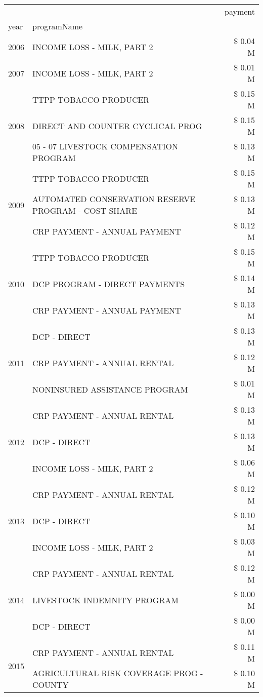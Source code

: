 \begin{tabular}{llr}
\toprule
 &  & payment \\
year & programName &  \\
\midrule
2006 & INCOME LOSS - MILK, PART 2 & \$ 0.04 M \\
\cline{1-3}
2007 & INCOME LOSS - MILK, PART 2 & \$ 0.01 M \\
\cline{1-3}
\multirow[t]{3}{*}{2008} & TTPP TOBACCO PRODUCER & \$ 0.15 M \\
 & DIRECT AND COUNTER CYCLICAL PROG & \$ 0.15 M \\
 & 05 - 07 LIVESTOCK COMPENSATION PROGRAM & \$ 0.13 M \\
\cline{1-3}
\multirow[t]{3}{*}{2009} & TTPP TOBACCO PRODUCER & \$ 0.15 M \\
 & AUTOMATED CONSERVATION RESERVE PROGRAM - COST SHARE & \$ 0.13 M \\
 & CRP PAYMENT - ANNUAL PAYMENT & \$ 0.12 M \\
\cline{1-3}
\multirow[t]{3}{*}{2010} & TTPP TOBACCO PRODUCER & \$ 0.15 M \\
 & DCP PROGRAM - DIRECT PAYMENTS & \$ 0.14 M \\
 & CRP PAYMENT - ANNUAL PAYMENT & \$ 0.13 M \\
\cline{1-3}
\multirow[t]{3}{*}{2011} & DCP - DIRECT & \$ 0.13 M \\
 & CRP PAYMENT - ANNUAL RENTAL & \$ 0.12 M \\
 & NONINSURED ASSISTANCE PROGRAM & \$ 0.01 M \\
\cline{1-3}
\multirow[t]{3}{*}{2012} & CRP PAYMENT - ANNUAL RENTAL & \$ 0.13 M \\
 & DCP - DIRECT & \$ 0.13 M \\
 & INCOME LOSS - MILK, PART 2 & \$ 0.06 M \\
\cline{1-3}
\multirow[t]{3}{*}{2013} & CRP PAYMENT - ANNUAL RENTAL & \$ 0.12 M \\
 & DCP - DIRECT & \$ 0.10 M \\
 & INCOME LOSS - MILK, PART 2 & \$ 0.03 M \\
\cline{1-3}
\multirow[t]{3}{*}{2014} & CRP PAYMENT - ANNUAL RENTAL & \$ 0.12 M \\
 & LIVESTOCK INDEMNITY PROGRAM & \$ 0.00 M \\
 & DCP - DIRECT & \$ 0.00 M \\
\cline{1-3}
\multirow[t]{3}{*}{2015} & CRP PAYMENT - ANNUAL RENTAL & \$ 0.11 M \\
 & AGRICULTURAL RISK COVERAGE PROG - COUNTY & \$ 0.10 M \\

\end{tabular}
